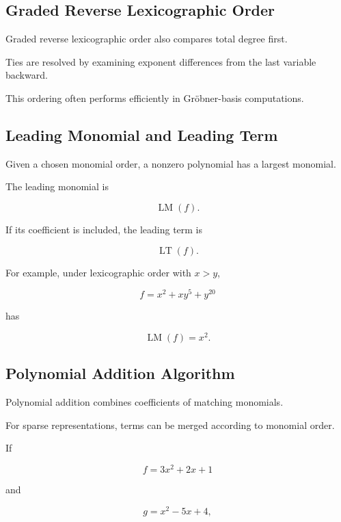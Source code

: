 \subsection{Graded Reverse Lexicographic Order}
\label{subsec:grevlex}

Graded reverse lexicographic order also compares total degree first.

Ties are resolved by examining exponent differences from the last
variable backward.

This ordering often performs efficiently in Gröbner-basis computations.

\subsection{Leading Monomial and Leading Term}
\label{subsec:leading-monomial-term}

Given a chosen monomial order, a nonzero polynomial has a largest
monomial.

The leading monomial is

\[
\boxed{
\operatorname{LM}(f).
}
\]

If its coefficient is included, the leading term is

\[
\boxed{
\operatorname{LT}(f).
}
\]

For example, under lexicographic order with \(x>y\),

\[
f=x^2+xy^5+y^{20}
\]

has

\[
\boxed{
\operatorname{LM}(f)=x^2.
}
\]

\subsection{Polynomial Addition Algorithm}
\label{subsec:polynomial-addition-algorithm}

Polynomial addition combines coefficients of matching monomials.

For sparse representations, terms can be merged according to monomial
order.

If

\[
f
=
3x^2+2x+1
\]

and

\[
g
=
x^2-5x+4,
\]


